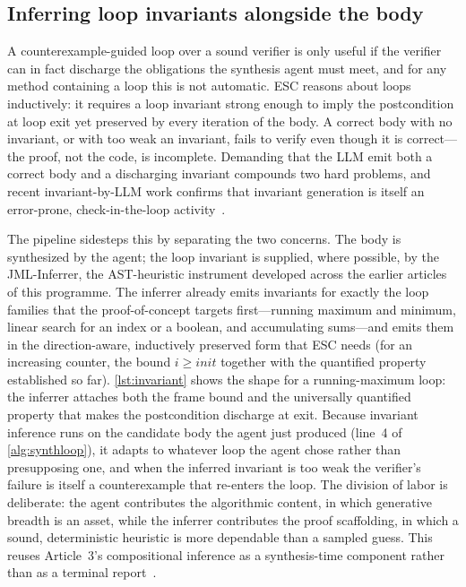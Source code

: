 \subsection{Inferring loop invariants alongside the body}
\label{subsec:invariants}

A counterexample-guided loop over a sound verifier is only useful if the verifier can in fact discharge the obligations the synthesis agent must meet, and for any method containing a loop this is not automatic. ESC reasons about loops inductively: it requires a loop invariant strong enough to imply the postcondition at loop exit yet preserved by every iteration of the body. A correct body with no invariant, or with too weak an invariant, fails to verify even though it is correct---the proof, not the code, is incomplete. Demanding that the LLM emit both a correct body and a discharging invariant compounds two hard problems, and recent invariant-by-LLM work confirms that invariant generation is itself an error-prone, check-in-the-loop activity~\cite{kamath2023loopy,chakraborty2023ranking,pei2023llminvariants}.

The pipeline sidesteps this by separating the two concerns. The body is synthesized by the agent; the loop invariant is supplied, where possible, by the JML-Inferrer, the AST-heuristic instrument developed across the earlier articles of this programme. The inferrer already emits invariants for exactly the loop families that the proof-of-concept targets first---running maximum and minimum, linear search for an index or a boolean, and accumulating sums---and emits them in the direction-aware, inductively preserved form that ESC needs (for an increasing counter, the bound $i \geq \mathit{init}$ together with the quantified property established so far). \cref{lst:invariant} shows the shape for a running-maximum loop: the inferrer attaches both the frame bound and the universally quantified property that makes the postcondition discharge at exit. Because invariant inference runs on the candidate body the agent just produced (line~4 of \cref{alg:synthloop}), it adapts to whatever loop the agent chose rather than presupposing one, and when the inferred invariant is too weak the verifier's failure is itself a counterexample that re-enters the loop. The division of labor is deliberate: the agent contributes the algorithmic content, in which generative breadth is an asset, while the inferrer contributes the proof scaffolding, in which a sound, deterministic heuristic is more dependable than a sampled guess. This reuses Article~3's compositional inference as a synthesis-time component rather than as a terminal report~\cite{edmonds_article3}.

